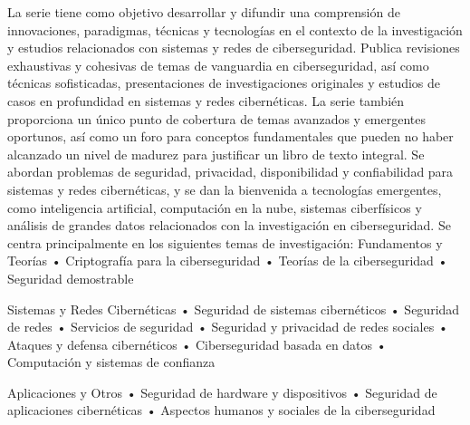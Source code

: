 \documentclass[11pt, a4paper]{article} %
\begin{document}
La serie tiene como objetivo desarrollar y difundir una comprensión de innovaciones, paradigmas, técnicas y tecnologías en el contexto de la investigación y estudios relacionados con sistemas y redes de ciberseguridad. Publica revisiones exhaustivas y cohesivas de temas de vanguardia en ciberseguridad, así como técnicas sofisticadas, presentaciones de investigaciones originales y estudios de casos en profundidad en sistemas y redes cibernéticas. La serie también proporciona un único punto de cobertura de temas avanzados y emergentes oportunos, así como un foro para conceptos fundamentales que pueden no haber alcanzado un nivel de madurez para justificar un libro de texto integral. Se abordan problemas de seguridad, privacidad, disponibilidad y confiabilidad para sistemas y redes cibernéticas, y se dan la bienvenida a tecnologías emergentes, como inteligencia artificial, computación en la nube, sistemas ciberfísicos y análisis de grandes datos relacionados con la investigación en ciberseguridad. Se centra principalmente en los siguientes temas de investigación:
Fundamentos y Teorías
• Criptografía para la ciberseguridad
• Teorías de la ciberseguridad
• Seguridad demostrable

Sistemas y Redes Cibernéticas
• Seguridad de sistemas cibernéticos
• Seguridad de redes
• Servicios de seguridad
• Seguridad y privacidad de redes sociales
• Ataques y defensa cibernéticos
• Ciberseguridad basada en datos
• Computación y sistemas de confianza

Aplicaciones y Otros
• Seguridad de hardware y dispositivos
• Seguridad de aplicaciones cibernéticas
• Aspectos humanos y sociales de la ciberseguridad
\end{document}
